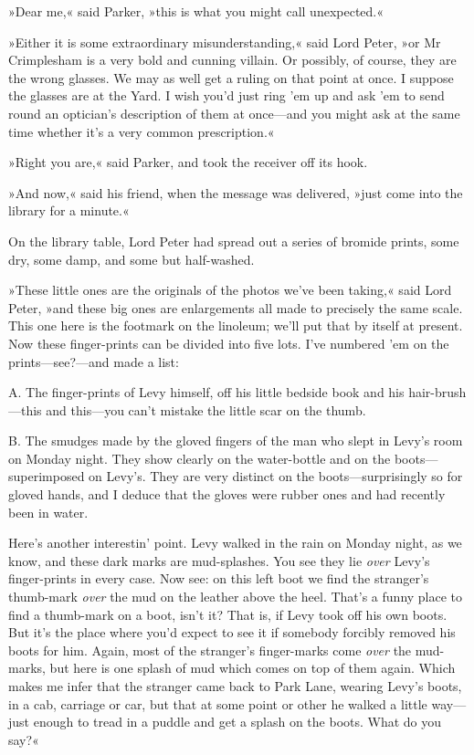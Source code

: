 »Dear me,« said Parker, »this is what you might call unexpected.«

»Either it is some extraordinary misunderstanding,« said Lord Peter, »or Mr Crimplesham is a very bold and cunning villain. Or possibly, of course, they are the wrong glasses. We may as well get a ruling on that point at once. I suppose the glasses are at the Yard. I wish you'd just ring 'em up and ask 'em to send round an optician's description of them at once—and you might ask at the same time whether it's a very common prescription.«

»Right you are,« said Parker, and took the receiver off its hook.

»And now,« said his friend, when the message was delivered, »just come into the library for a minute.«

On the library table, Lord Peter had spread out a series of bromide prints, some dry, some damp, and some but half-washed.

»These little ones are the originals of the photos we've been taking,« said Lord Peter, »and these big ones are enlargements all made to precisely the same scale. This one here is the footmark on the linoleum; we'll put that by itself at present. Now these finger-prints can be divided into five lots. I've numbered 'em on the prints—see?---and made a list:

\textsc{A.} The finger-prints of Levy himself, off his little bedside book and his hair-brush—this and this—you can't mistake the little scar on the thumb.

\textsc{B.} The smudges made by the gloved fingers of the man who slept in Levy's room on Monday night. They show clearly on the water-bottle and on the boots—superimposed on Levy's. They are very distinct on the boots—surprisingly so for gloved hands, and I deduce that the gloves were rubber ones and had recently been in water.

Here's another interestin' point. Levy walked in the rain on Monday night, as we know, and these dark marks are mud-splashes. You see they lie \textit{over} Levy's finger-prints in every case. Now see: on this left boot we find the stranger's thumb-mark \textit{over} the mud on the leather above the heel. That's a funny place to find a thumb-mark on a boot, isn't it? That is, if Levy took off his own boots. But it's the place where you'd expect to see it if somebody forcibly removed his boots for him. Again, most of the stranger's finger-marks come \textit{over} the mud-marks, but here is one splash of mud which comes on top of them again. Which makes me infer that the stranger came back to Park Lane, wearing Levy's boots, in a cab, carriage or car, but that at some point or other he walked a little way—just enough to tread in a puddle and get a splash on the boots. What do you say?«

